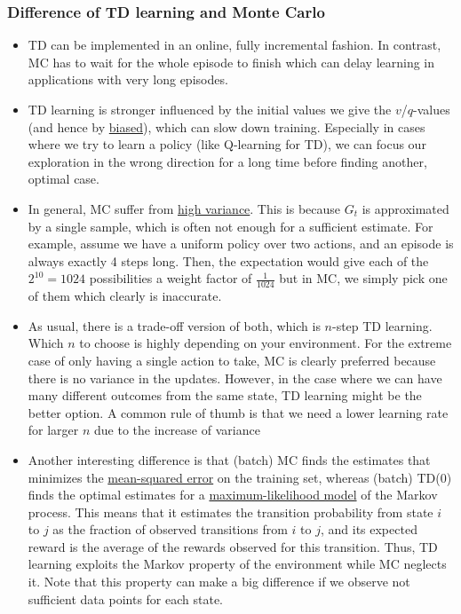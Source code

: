 \subsubsection{Difference of TD learning and Monte Carlo}
\label{sec:value_based_tabular_difference_TD_MC}
\begin{itemize}
	\item TD can be implemented in an online, fully incremental fashion. In contrast, MC has to wait for the whole episode to finish which can delay learning in applications with very long episodes.
	\item TD learning is stronger influenced by the initial values we give the $v$/$q$-values (and hence by \underline{biased}), which can slow down training. Especially in cases where we try to learn a policy (like Q-learning for TD), we can focus our exploration in the wrong direction for a long time before finding another, optimal case.
	\item In general, MC suffer from \underline{high variance}. This is because $G_t$ is approximated by a single sample, which is often not enough for a sufficient estimate. For example, assume we have a uniform policy over two actions, and an episode is always exactly 4 steps long. Then, the expectation would give each of the $2^10=1024$ possibilities a weight factor of $\frac{1}{1024}$ but in MC, we simply pick one of them which clearly is inaccurate.
	\item As usual, there is a trade-off version of both, which is $n$-step TD learning. Which $n$ to choose is highly depending on your environment. For the extreme case of only having a single action to take, MC is clearly preferred because there is no variance in the updates. However, in the case where we can have many different outcomes from the same state, TD learning might be the better option. A common rule of thumb is that we need a lower learning rate for larger $n$ due to the increase of variance
	\item Another interesting difference is that (batch) MC finds the estimates that minimizes the \underline{mean-squared error} on the training set, whereas (batch) TD(0) finds the optimal estimates for a \underline{maximum-likelihood model} of the Markov process. This means that it estimates the transition probability from state $i$ to $j$ as the fraction of observed transitions from $i$ to $j$, and its expected reward is the average of the rewards observed for this transition. Thus, TD learning exploits the Markov property of the environment while MC neglects it. Note that this property can make a big difference if we observe not sufficient data points for each state.
\end{itemize}

